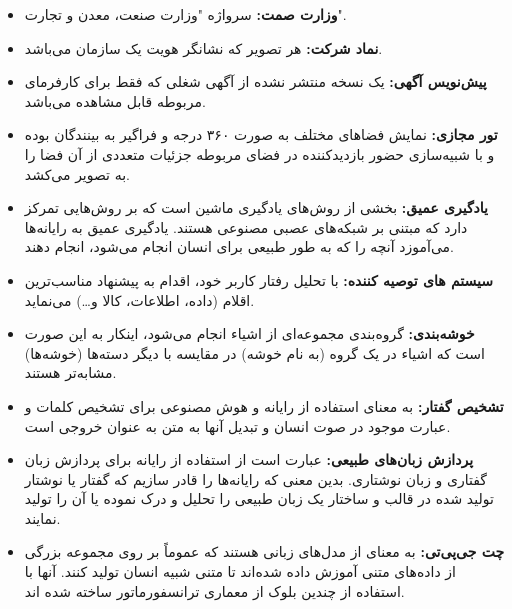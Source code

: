 \documentclass[12pt]{article}
\begin{document}
\begin{itemize}
		\item
		\textbf{وزارت صمت:}
		 سرواژه "وزارت صنعت، معدن و تجارت".
		\item
		\textbf{نماد شرکت:}
		 هر تصویر که نشانگر هویت یک سازمان می‌باشد.
		\item
		\textbf{پیش‌نویس آگهی:}
		یک نسخه منتشر نشده از آگهی شغلی که فقط برای کارفرمای مربوطه قابل مشاهده می‌باشد.
		\item
		\textbf{تور مجازی:‌}
		نمایش فضاهای مختلف به صورت ۳۶۰ درجه و فراگیر به بینندگان بوده و با شبیه‌سازی حضور بازدیدکننده در فضای مربوطه جزئیات متعددی از آن فضا را به تصویر می‌کشد.
		\item
		\textbf{یادگیری عمیق:}
		  بخشی از روش‌های یادگیری ماشین است که بر روش‌هایی تمرکز دارد که مبتنی بر شبکه‌های عصبی مصنوعی هستند. یادگیری عمیق به رایانه‌ها می‌آموزد آنچه را که به طور طبیعی برای انسان انجام می‌شود، انجام دهند.
		\item
		\textbf{سیستم های توصیه کننده:}
		  با تحلیل رفتار کاربر خود، اقدام به پیشنهاد مناسب‌ترین اقلام (داده، اطلاعات، کالا و…) می‌نماید.
		\item
		\textbf{خوشه‌بندی:}
		 گروه‌بندی مجموعه‌ای از اشیاء انجام می‌شود، اینکار به این صورت است که اشیاء در یک گروه (به نام خوشه) در مقایسه با دیگر دسته‌ها (خوشه‌ها) مشابه‌تر هستند.
		\item
		\textbf{تشخیص گفتار:}
		  به معنای استفاده از رایانه و هوش مصنوعی برای تشخیص کلمات و عبارت موجود در صوت انسان و تبدیل آنها به متن به عنوان خروجی است.
		\item
		\textbf{پردازش زبان‌های طبیعی:}
		 عبارت است از استفاده از رایانه برای پردازش زبان گفتاری و زبان نوشتاری. بدین معنی که رایانه‌ها را قادر سازیم که گفتار یا نوشتار تولید شده در قالب و ساختار یک زبان طبیعی را تحلیل و درک نموده یا آن را تولید نمایند.
		\item
		\textbf{چت جی‌پی‌تی:}
		 به معنای
		 از مدل‌های زبانی هستند که عموماً بر روی مجموعه بزرگی از داده‌های متنی آموزش داده شده‌اند تا متنی شبیه انسان تولید کنند. آنها با استفاده از چندین بلوک از معماری ترانسفورماتور ساخته شده اند.
	\end{itemize}
\end{document}
